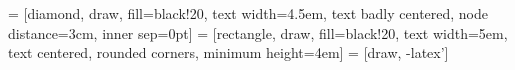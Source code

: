 \usepackage{tikz}
\usetikzlibrary{shapes,arrows}

 = [diamond, draw, fill=black!20, 
    text width=4.5em, text badly centered, node distance=3cm, inner sep=0pt]
 = [rectangle, draw, fill=black!20, 
    text width=5em, text centered, rounded corners, minimum height=4em]
 = [draw, -latex']
